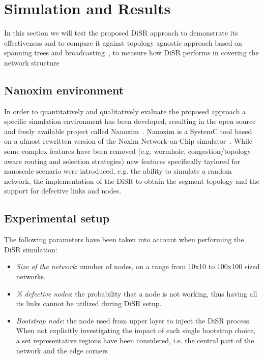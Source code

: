 
\section{Simulation and Results}
\label{sec:simulation}

In this section we will test the proposed DiSR approach to demonstrate
its effectiveness and to compare it against topology agnostic approach
based on spanning trees and
broadcasting~\cite{Patwardhan05evaluatingthe}, to measure how DiSR
performs in covering the network structure


\subsection{Nanoxim environment}

In order to quantitatively and qualitatively evaluate the proposed approach a
specific simulation environment has been developed, resulting in
the open source and freely available project called
Nanoxim~\cite{nanoxim}.
Nanoxim is a SystemC tool based on a almost rewritten
version of the Noxim Network-on-Chip simulator~\cite{noxim}. While some
complex features have been removed (e.g. wormhole, congestion/topology
aware routing and selection strategies) new features specifically
taylored for nanoscale scenario were introduced, e.g. the ability to simulate a random
network, the implementation of the DiSR to obtain the segment topology
and the support for defective links and nodes.

\subsection{Experimental setup}
The following parameters have been taken into account when
performing the DiSR simulation:
\begin{itemize}
\item {\emph{Size of the network}}: number of nodes, on a range from
10x10 to 100x100 sized networks. 
\item {\emph{\% defective nodes}}: the probability that a node is not
working, thus having all its links cannot be utilized during DiSR setup.  
\item {\emph{Bootstrap node}}: the node used from upper layer 
to inject the DiSR process. When not explicitly investigating the
impact of each single bootstrap choice, a set representative regions have been
considered, i.e. the central part of the network and the edge corners
\end{itemize}

